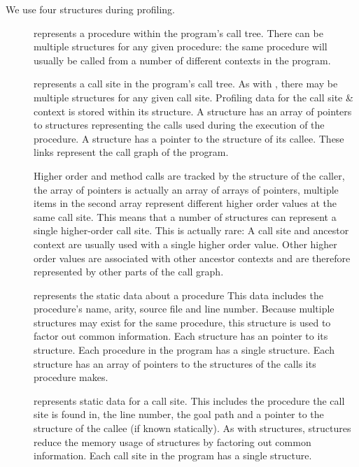 We use four structures during profiling.

\begin{description}

    \item[\PD]
    represents a procedure within the program's call tree.
    There can be multiple \PD structures for any given procedure:
    the same procedure will usually be called from a number of different
    contexts in the program.

    \item[\CSD]
    represents a call site in the program's call tree.
    As with \PD, there may be multiple \CSD structures for any given
    call site.
    Profiling data for the call site \& context is stored within its \CSD
    structure.
    A \PD structure has an array of pointers to \CSD structures representing
    the calls used during the execution of the procedure.
    A \CSD structure has a pointer to the \PD structure of its callee.
    These links represent the call graph of the program.

    Higher order and method calls are tracked by the \PD structure of the
    caller,
    the array of pointers is actually an array of arrays of pointers,
    multiple items in the second array represent different higher order
    values at the same call site.
    This means that a number of \CSD structures can represent a single
    higher-order call site.
    This is actually rare:
    A call site and ancestor context are usually used with a single higher
    order value.
    Other higher order values are associated with other ancestor contexts
    and are therefore represented by other parts of the call graph.

    \item[\PS]
    represents the static data about a procedure
    This data includes the procedure's name, arity, source file and line
    number.
    Because multiple \PD structures may exist for the same procedure,
    this structure is used to factor out common information.
    Each \PD structure has an pointer to its \PS structure.
    Each procedure in the program has a single \PS structure.
    Each \PS structure has an array of pointers to the \CSS structures
    of the calls its procedure makes.

    \item[\CSS]
    represents static data for a call site.
    This includes the procedure the call site is found in, the line number,
    the goal path and a pointer to the \PS structure of the callee (if known
    statically).
    As with \PS structures,
    \CSS structures reduce the memory usage of \CSD structures by
    factoring out common information.
    Each call site in the program has a single \CSS structure.

\end{description}

